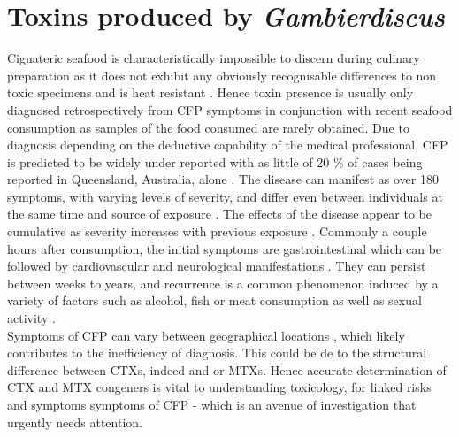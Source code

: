 \documentclass[12pt]{article}
\begin{document}
\section{Toxins produced by \emph{Gambierdiscus}}


Ciguateric seafood is characteristically impossible to discern during culinary preparation as it does not exhibit any obviously recognisable differences to non toxic specimens and is heat resistant \cite{withers1982ciguatera}. Hence toxin presence is usually only diagnosed retrospectively from CFP symptoms in conjunction with recent seafood consumption \cite{sims1987theoretical} as samples of the food consumed are rarely obtained. Due to diagnosis depending on the deductive capability of the medical professional, CFP is predicted to be widely under reported with as little of 20 \% of cases being reported  in Queensland, Australia, alone \cite{lewis2006ciguatera}. The disease can manifest as over 180 symptoms, with varying levels of severity, and differ even between individuals at the same time and source of exposure \cite{sims1987theoretical}. The effects of the disease appear to be cumulative as severity increases with previous exposure \cite{emerson1983preliminary}. Commonly a couple hours after consumption, the initial symptoms are gastrointestinal which can be followed by cardiovascular and neurological manifestations \cite{sims1987theoretical}. They can persist between weeks to years, and recurrence is a common phenomenon induced by a variety of factors such as alcohol, fish or meat consumption \cite{lewis2006ciguatera} as well as sexual activity \cite{lange1992travel}. \\
Symptoms of CFP can vary between geographical locations \cite{molgo2000ciguatera,dickey2010ciguatera}, which likely contributes to the inefficiency of diagnosis. This could be de to the structural difference between CTXs, indeed and or MTXs. Hence accurate determination of CTX and MTX congeners is vital to understanding toxicology, for linked risks and symptoms symptoms of CFP - which is an avenue of investigation that urgently needs attention.\\
\end{document}
